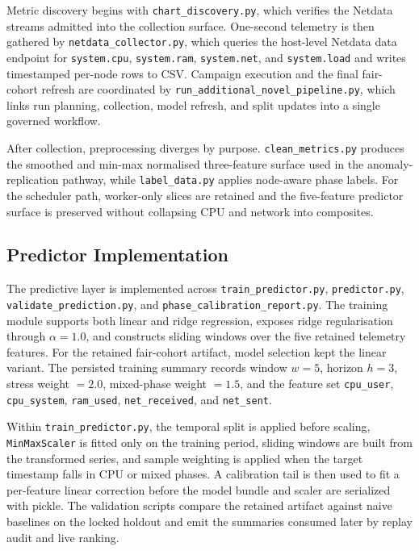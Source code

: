 Metric discovery begins with \texttt{chart\_discovery.py}, which verifies the Netdata streams admitted into the collection surface. One-second telemetry is then gathered by \texttt{netdata\_collector.py}, which queries the host-level Netdata data endpoint for \texttt{system.cpu}, \texttt{system.ram}, \texttt{system.net}, and \texttt{system.load} and writes timestamped per-node rows to CSV. Campaign execution and the final fair-cohort refresh are coordinated by \texttt{run\_additional\_novel\_pipeline.py}, which links run planning, collection, model refresh, and split updates into a single governed workflow.

After collection, preprocessing diverges by purpose. \texttt{clean\_metrics.py} produces the smoothed and min-max normalised three-feature surface used in the anomaly-replication pathway, while \texttt{label\_data.py} applies node-aware phase labels. For the scheduler path, worker-only slices are retained and the five-feature predictor surface is preserved without collapsing CPU and network into composites.

\subsection{Predictor Implementation}

The predictive layer is implemented across \texttt{train\_predictor.py}, \texttt{predictor.py}, \texttt{validate\_prediction.py}, and \texttt{phase\_calibration\_report.py}. The training module supports both linear and ridge regression, exposes ridge regularisation through \(\alpha = 1.0\), and constructs sliding windows over the five retained telemetry features. For the retained fair-cohort artifact, model selection kept the linear variant. The persisted training summary records window \(w = 5\), horizon \(h = 3\), stress weight \(= 2.0\), mixed-phase weight \(= 1.5\), and the feature set \texttt{cpu\_user}, \texttt{cpu\_system}, \texttt{ram\_used}, \texttt{net\_received}, and \texttt{net\_sent}.

Within \texttt{train\_predictor.py}, the temporal split is applied before scaling, \texttt{MinMaxScaler} is fitted only on the training period, sliding windows are built from the transformed series, and sample weighting is applied when the target timestamp falls in CPU or mixed phases. A calibration tail is then used to fit a per-feature linear correction before the model bundle and scaler are serialized with pickle. The validation scripts compare the retained artifact against naive baselines on the locked holdout and emit the summaries consumed later by replay audit and live ranking.


